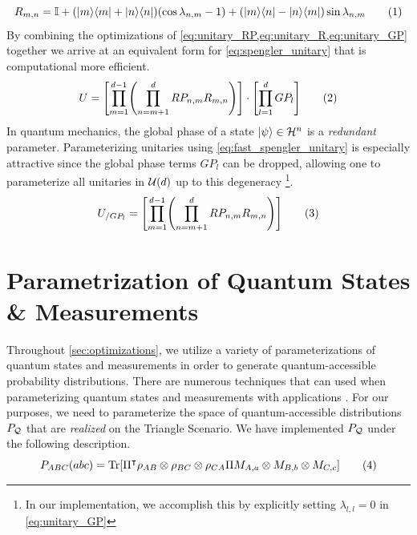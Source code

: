 \documentclass[aps, 10pt, english, twoside, pra, nofootinbib, longbibliography]{revtex4-1}
\theoremstyle{plain}
\theoremstyle{definition}
\theoremstyle{remark}
\newcommand{\netperm}{\Pi}
\newcommand{\Hilb}{\mathcal{H}}
\begin{document}
    \[ R_{m,n} = \mathbb{I} + \br{\ket{m}\bra{m} + \ket{n}\bra{n}} \br{\cos\lambda_{n,m} - 1} + \br{\ket{m}\bra{n} - \ket{n}\bra{m}} \sin\lambda_{n,m} \eq \label{eq:unitary_R} \]
    By combining the optimizations of \cref{eq:unitary_RP,eq:unitary_R,eq:unitary_GP} together we arrive at an equivalent form for \cref{eq:spengler_unitary} that is computational more efficient.
    \[ U = \bs{\prod_{m=1}^{d-1} \br{\prod_{n=m+1}^{d} RP_{n,m}R_{m,n}}} \cdot \bs{\prod_{l=1}^{d} GP_l} \eq \label{eq:fast_spengler_unitary} \]
    In quantum mechanics, the global phase of a state $\ket{\psi} \in \Hilb^n$ is a \textit{redundant} parameter. Parameterizing unitaries using \cref{eq:fast_spengler_unitary} is especially attractive since the global phase terms $GP_l$ can be dropped, allowing one to parameterize all unitaries in $\mathcal{U}\br{d}$ up to this degeneracy \cite{Spengler_2010_Unitary}\footnote{In our implementation, we accomplish this by explicitly setting $\lambda_{l,l} = 0$ in \cref{eq:unitary_GP}}.
    \[ U_{/ GP_l} = \bs{\prod_{m=1}^{d-1} \br{\prod_{n=m+1}^{d} RP_{n,m}R_{m,n}}} \eq \label{eq:fast_spengler_unitary_gp} \]

    \section{Parametrization of Quantum States \& Measurements}
    \label{sec:param_quantum_states}
    Throughout \cref{sec:optimizations}, we utilize a variety of parameterizations of quantum states and measurements in order to generate quantum-accessible probability distributions. There are numerous techniques that can used when parameterizing quantum states and measurements \cite{Petz_2015, Hedemann_2013,Spengler_2010_Unitary,Fujii_2005,James_2001} with applications . For our purposes, we need to parameterize the space of quantum-accessible distributions $\prob[\mathcal{Q}]$ that are \textit{realized} on the Triangle Scenario. We have implemented $\prob[\mathcal{Q}]$ under the following description.
    \[ \prob[ABC]\br{abc} = \Tr\bs{\netperm^\intercal \rho_{AB}\otimes\rho_{BC}\otimes\rho_{CA} \netperm M_{A,a}\otimes M_{B,b} \otimes M_{C,c}} \eq \label{eq:triangle_quantum_distributions} \]
\end{document}
